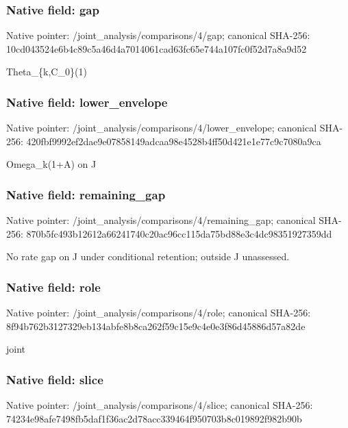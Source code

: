 \documentclass[10pt,a4paper]{article}
\begin{document}
\subsubsection{Native field: gap}
Native pointer: /joint\_\allowbreak{}analysis/comparisons/4/gap; canonical SHA-256: 10cd043524e6b4c89c5a46d4a7014061cad63fc65e744a107fc0f52d7a8a9d52

\begingroup\raggedright\sloppy Theta\_\allowbreak{}\{k,\allowbreak{}C\_\allowbreak{}0\}(1)\par\endgroup

\subsubsection{Native field: lower\_\allowbreak{}envelope}
Native pointer: /joint\_\allowbreak{}analysis/comparisons/4/lower\_\allowbreak{}envelope; canonical SHA-256: 420fbf9992ef2dae9e07858149adcaa98e4528b4ff50d421e1e77c9c7080a9ca

\begingroup\raggedright\sloppy Omega\_\allowbreak{}k(1+A) on J\par\endgroup

\subsubsection{Native field: remaining\_\allowbreak{}gap}
Native pointer: /joint\_\allowbreak{}analysis/comparisons/4/remaining\_\allowbreak{}gap; canonical SHA-256: 870b5fc493b12612a66241740c20ac96cc115da75bd88e3c4dc98351927359dd

\begingroup\raggedright\sloppy No rate gap on J under conditional retention;\allowbreak{} outside J unassessed.\par\endgroup

\subsubsection{Native field: role}
Native pointer: /joint\_\allowbreak{}analysis/comparisons/4/role; canonical SHA-256: 8f94b762b3127329eb134abfe8b8ca262f59c15e9c4e0e3f86d45886d57a82de

\begingroup\raggedright\sloppy joint\par\endgroup

\subsubsection{Native field: slice}
Native pointer: /joint\_\allowbreak{}analysis/comparisons/4/slice; canonical SHA-256: 74234e98afe7498fb5daf1f36ac2d78acc339464f950703b8c019892f982b90b
\end{document}
